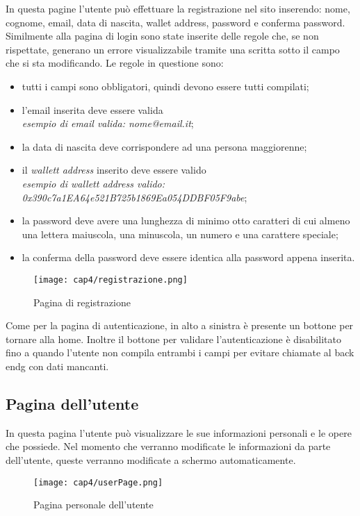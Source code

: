 In questa pagine l'utente può effettuare la registrazione nel sito inserendo: nome, cognome, email, data di nascita, wallet address, password e conferma password. Similmente alla pagina di login sono state inserite delle regole che, se non rispettate, generano un errore visualizzabile tramite una scritta sotto il campo che si sta modificando. Le regole in questione sono:
\begin{itemize}
	\item tutti i campi sono obbligatori, quindi devono essere tutti compilati;
	\item l'email inserita deve essere valida\\
	\textit{esempio di email valida: nome@email.it};
	\item la data di nascita deve corrispondere ad una persona maggiorenne;
	\item il\textit{ wallett address} inserito deve essere valido\\ 
	\textit{esempio di \textit{wallett address} valido: 0x390c7a1EA64e521B725b1869Ea054DDBF05F9abe};
	\item la password deve avere una lunghezza di minimo otto caratteri di cui almeno una lettera maiuscola, una minuscola, un numero e una carattere speciale;
	\item la conferma della password deve essere identica alla password appena inserita.
\end{itemize}
\begin{figure}[H]
	\begin{center}
		\texttt{[image: cap4/registrazione.png]}
		\caption{Pagina di registrazione}
	\end{center}
\end{figure}
Come per la pagina di autenticazione, in alto a sinistra è presente un bottone per tornare alla home. Inoltre il bottone per validare l'autenticazione è disabilitato fino a quando l'utente non compila entrambi i campi per evitare chiamate al \gls{back endg} con dati mancanti.

\subsection{Pagina dell'utente}
\label{subsec:pagina-utente}

In questa pagina l'utente può visualizzare le sue informazioni personali e le opere che possiede. Nel momento che verranno modificate le informazioni da parte dell'utente, queste verranno modificate a schermo automaticamente.
\begin{figure}[H]
	\begin{center}
		\texttt{[image: cap4/userPage.png]}
		\caption{Pagina personale dell'utente}
	\end{center}
\end{figure}

